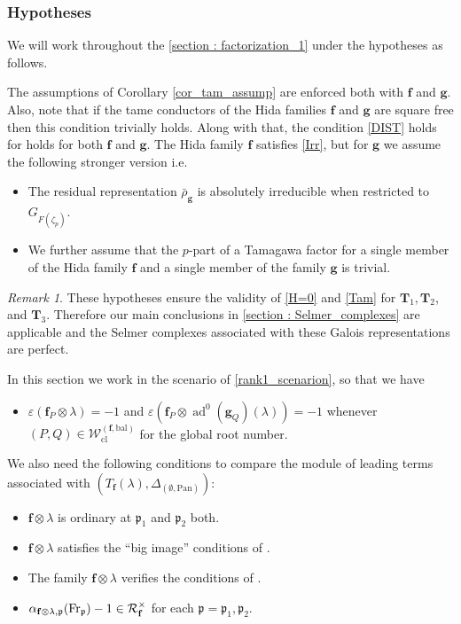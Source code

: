 \documentclass[10pt]{amsart}
\makeatletter
\numberwithin{equation}{section}
\newcommand{\mylabel}[2]{#2\def\@currentlabel{#2}\label{#1}}
\theoremstyle{definition}
\theoremstyle{remark} %
\newtheorem{rmk}[thm]{Remark}
\newcommand{\mrm}{\mathrm}
\newcommand{\ad}{\operatorname{ad}}
\newcommand{\pan}{\mathrm{Pan}}
\renewcommand{\b}{\mathrm{bal}}
\newcommand{\f}{\mathbf{f}}
\newcommand{\g}{\mathbf{g}}
\newcommand{\p}{\mathfrak{p}}
\newcommand{\R}{\mathcal{R}}
\newcommand{\T}{\mathbf{T}}
\newcommand{\W}{\mathcal{W}}
\makeatother
\begin{document}
		\subsubsection{Hypotheses}
		\label{rank1_hypo}
		We will work throughout the \cref{section : factorization_1} under the hypotheses as follows. 
		
		The assumptions of Corollary \ref{cor_tam_assump} are enforced both with $ \f $ and $ \g $. Also, note that if the tame conductors of the Hida families $ \f $ and $ \g $ are square free then this condition trivially holds. Along with that, the condition \ref{DIST} holds for holds for both  $ \f $ and $ \g $. The Hida family $ \f $ satisfies \ref{Irr}, but for $ \g $ we assume the following stronger version i.e.
		\begin{itemize}
			\item[\mylabel{Irr+}{\textbf{(Irr+)}}] The residual representation $ \bar{\rho}_{\g} $ is absolutely irreducible when restricted to $ G_{F(\zeta_p)} $.
			\item[\mylabel{TAM}{\textbf{(TAM)}}] We further assume that the  $ p $-part of a Tamagawa factor for a single member of the Hida family $ \f $ and a single member of the family $ \g $ is trivial.
		\end{itemize}
		\begin{rmk}
			\label{hypo_rmk}
			These hypotheses ensure the validity of \ref{H=0} and \ref{Tam} for $ \T_{1},  \T_{2} $, and $ \T_{3} $. Therefore our main conclusions in \cref{section : Selmer_complexes} are applicable and the Selmer complexes associated with these Galois representations are perfect.
		\end{rmk}
		In this section we work in the scenario of \textsection\ref{rank1_scenarion}, so that we have 
		\begin{itemize}
			\item[\mylabel{Sign1}{\textbf{(S1)}}] $ \varepsilon(\f_P \otimes \lambda) = -1 $ and  $ \varepsilon(\f_P \otimes \ad^0(\g_Q)(\lambda) )= 
			-1$ whenever $(P,Q) \in \W_{\mrm{cl}}^{(\f,\b)}	$ for the global root number.
		\end{itemize}
		We also need the following conditions to compare the module of leading terms associated with $(T_{\f}(\lambda),\Delta_{(\emptyset, \pan)})$:
		\begin{itemize}
			\item[\mylabel{ord}{\textbf{(Ord)}}] $\f \otimes \lambda$ is ordinary at $ \p_1 $ and $ \p_2 $ both.
			\item[\mylabel{BI}{\textbf{(BI)}}] $\f \otimes \lambda$ satisfies the \enquote{big image} conditions of \cite[Definition 2.5.1]{loeffler2020iwasawatheoryquadratichilbert}. 
			\item[\mylabel{MC}{\textbf{(MC)}}] The family $\f \otimes \lambda $ verifies the conditions of \cite[Theorem 101]{Wan}.
			\item[\mylabel{NA}{\textbf{(NA)}}] $ \alpha_{\f \otimes \lambda,\p}(\mrm{Fr}_{\frak{p}}) -1 \in \R_{\f}^\times $ for each $ \p = \p_1, \p_2 $.
		\end{itemize}
		
\end{document}
